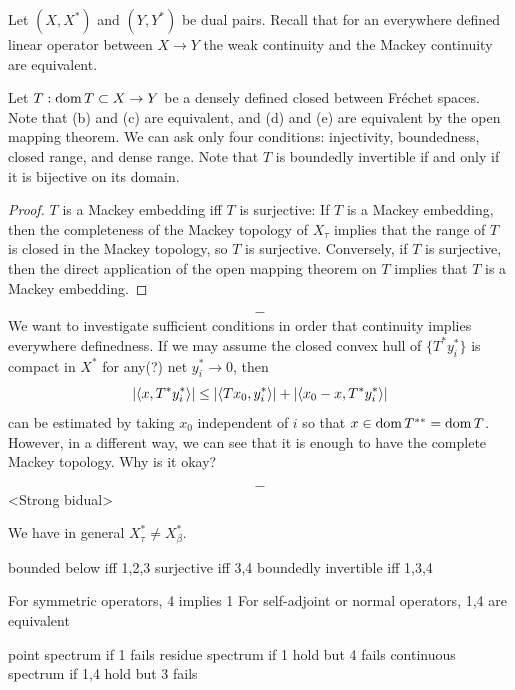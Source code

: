 \documentclass{../../large}
\begin{document}
\begin{prb}
Let $(X,X^*)$ and $(Y,Y^*)$ be dual pairs.
Recall that for an everywhere defined linear operator between $X\to Y$ the weak continuity and the Mackey continuity are equivalent.

Let $T:\operatorname{dom} T\subset X\to Y$ be a densely defined closed between Fr\'echet spaces.
Note that (b) and (c) are equivalent, and (d) and (e) are equivalent by the open mapping theorem.
We can ask only four conditions: injectivity, boundedness, closed range, and dense range.
Note that $T$ is boundedly invertible if and only if it is bijective on its domain.
\end{prb}
\begin{proof}

$T$ is a Mackey embedding iff $T$ is surjective:
If $T$ is a Mackey embedding, then the completeness of the Mackey topology of $X_\tau$ implies that the range of $T$ is closed in the Mackey topology, so $T$ is surjective.
Conversely, if $T$ is surjective, then the direct application of the open mapping theorem on $T$ implies that $T$ is a Mackey embedding.

\end{proof}

\[-\]
We want to investigate sufficient conditions in order that continuity implies everywhere definedness.
If we may assume the closed convex hull of $\{T^*y_i^*\}$ is compact in $X^*$ for any(?) net $y_i^*\to0$, then
\[|\langle x,T^*y_i^*\rangle|\le|\langle Tx_0,y_i^*\rangle|+|\langle x_0-x,T^*y_i^*\rangle|\]
can be estimated by taking $x_0$ independent of $i$ so that $x\in\operatorname{dom} T^{**}=\operatorname{dom} T$.
However, in a different way, we can see that it is enough to have the complete Mackey topology. Why is it okay?




\[-\]
<Strong bidual>

We have in general $X_\tau^*\ne X_\beta^*$.




bounded below iff 1,2,3
surjective iff 3,4
boundedly invertible iff 1,3,4

For symmetric operators, 4 implies 1
For self-adjoint or normal operators, 1,4 are equivalent

point spectrum if 1 fails
residue spectrum if 1 hold but 4 fails
continuous spectrum if 1,4 hold but 3 fails






\begin{prb}[Cores]
\end{prb}
\end{document}
